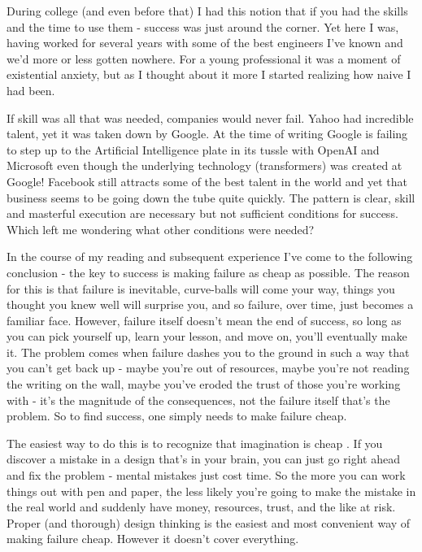 \documentclass[11pt,a5paper]{book}
\begin{document}
During college (and even before that) I had this notion that if you had the skills and the time to use them - success was just around the corner. Yet here I was, having worked for several years with some of the best engineers I've known and we'd more or less gotten nowhere. For a young professional it was a moment of existential anxiety, but as I thought about it more I started realizing how naive I had been.
\newline

If skill was all that was needed, companies would never fail. Yahoo had incredible talent, yet it was taken down by Google. At the time of writing Google is failing to step up to the Artificial Intelligence plate in its tussle with OpenAI and Microsoft even though the underlying technology (transformers) was created at Google! Facebook still attracts some of the best talent in the world and yet that business seems to be going down the tube quite quickly. The pattern is clear, skill and masterful execution are necessary but not sufficient conditions for success. Which left me wondering what other conditions were needed?
\newline

In the course of my reading and subsequent experience I've come to the following conclusion - the key to success is making failure as cheap as possible. The reason for this is that failure is inevitable, curve-balls will come your way, things you thought you knew well will surprise you, and so failure, over time, just becomes a familiar face. However, failure itself doesn't mean the end of success, so long as you can pick yourself up, learn your lesson, and move on, you'll eventually make it. The problem comes when failure dashes you to the ground in such a way that you can't get back up - maybe you're out of resources, maybe you're not reading the writing on the wall, maybe you've eroded the trust of those you're working with - it's the magnitude of the consequences, not the failure itself that's the problem. So to find success, one simply needs to make failure cheap.
\newline

The easiest way to do this is to recognize that imagination is cheap \cite{macmillan}. If you discover a mistake in a design that's in your brain, you can just go right ahead and fix the problem - mental mistakes just cost time. So the more you can work things out with pen and paper, the less likely you're going to make the mistake in the real world and suddenly have money, resources, trust, and the like at risk. Proper (and thorough) design thinking is the easiest and most convenient way of making failure cheap. However it doesn't cover everything.
\newline
\end{document}
